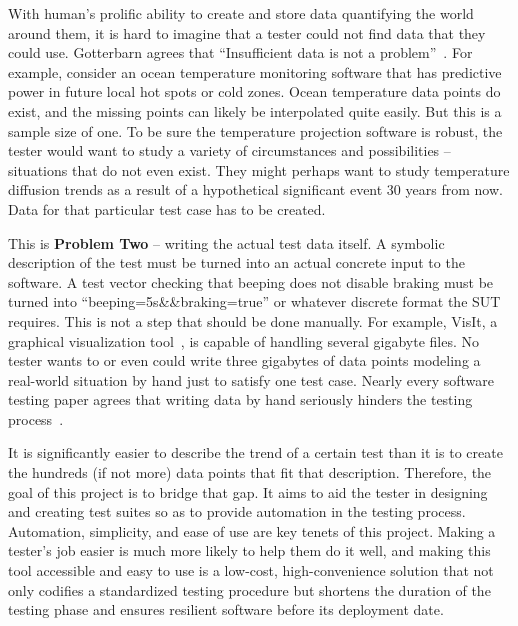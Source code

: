 With human's prolific ability to create and store data quantifying the world around them, it is hard to imagine that a tester could not find data that they could use. Gotterbarn agrees that ``Insufficient data is not a problem''~\cite{Gotterbarn:2016:CFC:2874239.2874248}. For example, consider an ocean temperature monitoring software that has predictive power in future local hot spots or cold zones. Ocean temperature data points do exist, and the missing points can likely be interpolated quite easily. But this is a sample size of one. To be sure the temperature projection software is robust, the tester would want to study a variety of circumstances and possibilities – situations that do not even exist. They might perhaps want to study temperature diffusion trends as a result of a hypothetical significant event 30 years from now. Data for that particular test case has to be created.

This is \textbf{Problem Two} -- writing the actual test data itself. A symbolic description of the test must be turned into an actual concrete input to the software. A test vector checking that beeping does not disable braking must be turned into ``beeping=5s\&\&braking=true'' or whatever discrete format the SUT requires. This is not a step that should be done manually. For example, VisIt, a graphical visualization tool~\cite{VisIt}, is capable of handling several gigabyte files. No tester wants to or even could write three gigabytes of data points modeling a real-world situation by hand just to satisfy one test case. Nearly every software testing paper agrees that writing data by hand seriously hinders the testing process~\cite{Misailovic:2007:PTG:1287624.1287645,Murphy:2007:PRT:1292414.1292425,Palka:2011:TOC:1982595.1982615,Patrick:2016:ATI:2970276.2970333}.

It is significantly easier to describe the trend of a certain test than it is to create the hundreds (if not more) data points that fit that description. Therefore, the goal of this project is to bridge that gap. It aims to aid the tester in designing and creating test suites so as to provide automation in the testing process. Automation, simplicity, and ease of use are key tenets of this project. Making a tester's job easier is much more likely to help them do it well, and making this tool accessible and easy to use is a low-cost, high-convenience solution that not only codifies a standardized testing procedure but shortens the duration of the testing phase and ensures resilient software before its deployment date. 
